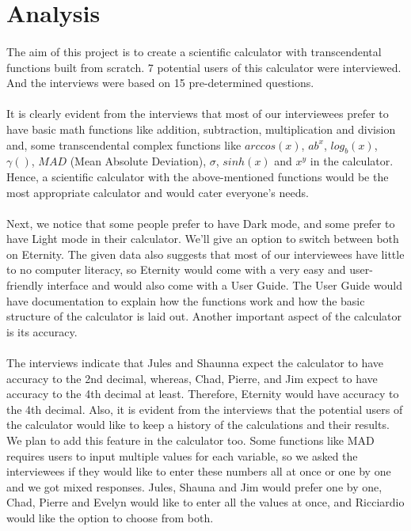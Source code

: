 \section{Analysis}
    \paragraph{}
    The aim of this project is to create a scientific calculator with transcendental functions built from scratch. 7 potential users of this calculator were interviewed. And the interviews were based on 15 pre-determined questions.
    
    \paragraph{}
    It is clearly evident from the interviews that most of our interviewees prefer to have basic math functions like addition, subtraction, multiplication and division and, some transcendental complex functions like $arccos(x)$, $ab^x$, $log_b(x)$, $\gamma ()$, $MAD$ (Mean Absolute Deviation), $\sigma$, $sinh(x)$ and $x^y$ in the calculator. Hence, a scientific calculator with the above-mentioned functions would be the most appropriate calculator and would cater everyone’s needs.
    
    \paragraph{}
    Next, we notice that some people prefer to have Dark mode, and some prefer to have Light mode in their calculator. We’ll give an option to switch between both on Eternity. The given data also suggests that most of our interviewees have little to no computer literacy, so Eternity would come with a very easy and user-friendly interface and would also come with a User Guide. The User Guide would have documentation to explain how the functions work and how the basic structure of the calculator is laid out. Another important aspect of the calculator is its accuracy.
    
    \paragraph{}
    The interviews indicate that Jules and Shaunna expect the calculator to have accuracy to the 2nd decimal, whereas, Chad, Pierre, and Jim expect to have accuracy to the 4th decimal at least. Therefore, Eternity would have accuracy to the 4th decimal. Also, it is evident from the interviews that the potential users of the calculator would like to keep a history of the calculations and their results. We plan to add this feature in the calculator too. Some functions like MAD  requires users to input multiple values for each variable, so we asked the interviewees if they would like to enter these numbers all at once or one by one and we got mixed responses. Jules, Shauna and Jim would prefer one by one, Chad, Pierre and Evelyn would like to enter all the values at once, and Ricciardio would like the option to choose from both.
    
